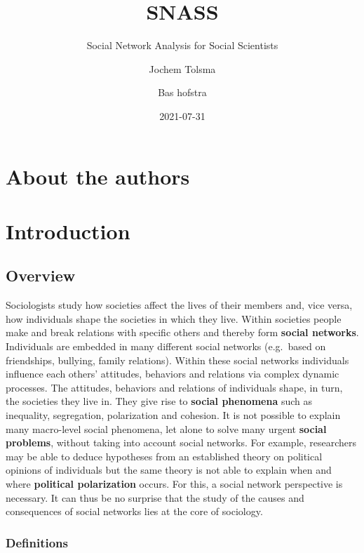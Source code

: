 \documentclass[
]{book}
\title{SNASS}
\subtitle{Social Network Analysis for Social Scientists}
\author{Jochem Tolsma \and Bas hofstra}
\date{2021-07-31}
\begin{document}
\maketitle

{
\setcounter{tocdepth}{1}
\tableofcontents
}
\hypertarget{about-the-authors}{%
\chapter*{About the authors}\label{about-the-authors}}

\hypertarget{intro}{%
\chapter{Introduction}\label{intro}}

\hypertarget{overview}{%
\section{Overview}\label{overview}}

Sociologists study how societies affect the lives of their members and, vice versa, how individuals shape the societies in which they live. Within societies people make and break relations with specific others and thereby form \textbf{social networks}.\\
Individuals are embedded in many different social networks (e.g.~based on friendships, bullying, family relations). Within these social networks individuals influence each others' attitudes, behaviors and relations via complex dynamic processes. The attitudes, behaviors and relations of individuals shape, in turn, the societies they live in. They give rise to \textbf{social phenomena} such as inequality, segregation, polarization and cohesion. It is not possible to explain many macro-level social phenomena, let alone to solve many urgent \textbf{social problems}, without taking into account social networks. For example, researchers may be able to deduce hypotheses from an established theory on political opinions of individuals but the same theory is not able to explain when and where \textbf{political polarization} occurs. For this, a social network perspective is necessary. It can thus be no surprise that the study of the causes and consequences of social networks lies at the core of sociology.

\hypertarget{definitions}{%
\subsection{Definitions}\label{definitions}}
\end{document}

